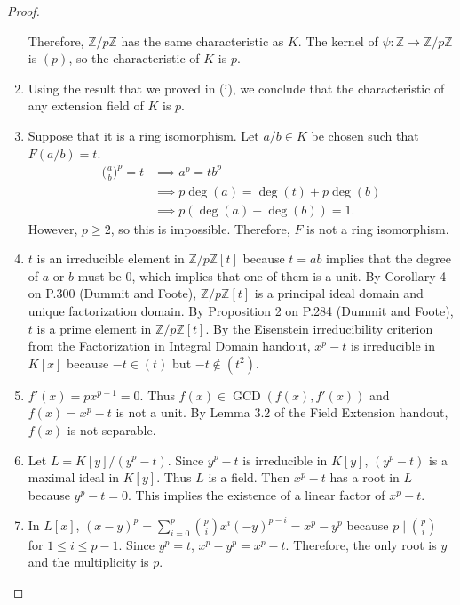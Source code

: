 \documentclass[12pt, psamsfonts]{amsart}
\theoremstyle{definition}
\theoremstyle{remark}
\DeclareMathOperator{\GCD}{GCD}
\numberwithin{equation}{section}
\begin{document}
\begin{proof}
\begin{enumerate}[label=(\roman*)]
      Therefore, $\mathbb{Z}/p\mathbb{Z}$ has the same characteristic as $K$.
      The kernel of $\psi: \mathbb{Z} \rightarrow \mathbb{Z}/p\mathbb{Z}$ is $(p)$, so the characteristic of $K$ is $p$.
    \item
      Using the result that we proved in (i), we conclude that the characteristic of any extension field of $K$ is $p$.
    \item
      Suppose that it is a ring isomorphism.
      Let $a / b \in K$ be chosen such that $F(a / b) = t$.
      \begin{align*}
        \big(\frac{a}{b}\big)^p = t
          &\implies a^p = tb^p \\
          &\implies p\deg(a) = \deg(t) + p\deg(b) \\
          &\implies p(\deg(a) - \deg(b)) = 1.
      \end{align*}
      However, $p \geq 2$, so this is impossible.
      Therefore, $F$ is not a ring isomorphism.
    \item
      $t$ is an irreducible element in $\mathbb{Z}/p\mathbb{Z}[t]$ because $t = ab$ implies that the degree of $a$ or $b$ must be 0, which implies that one of them is a unit.
      By Corollary 4 on P.300 (Dummit and Foote), $\mathbb{Z}/p\mathbb{Z}[t]$ is a principal ideal domain and unique factorization domain.
      By Proposition 2 on P.284 (Dummit and Foote), $t$ is a prime element in $\mathbb{Z}/p\mathbb{Z}[t]$.
      By the Eisenstein irreducibility criterion from the Factorization in Integral Domain handout, $x^p - t$ is irreducible in $K[x]$ because $-t \in (t)$ but $-t \notin (t^2)$.
    \item
      $f'(x) = px^{p - 1} = 0$.
      Thus $f(x) \in \GCD(f(x), f'(x))$ and $f(x) = x^p - t$ is not a unit.
      By Lemma 3.2 of the Field Extension handout, $f(x)$ is not separable.
    \item
      Let $L = K[y] / (y^p - t)$.
      Since $y^p - t$ is irreducible in $K[y]$, $(y^p - t)$ is a maximal ideal in $K[y]$.
      Thus $L$ is a field.
      Then $x^p - t$ has a root in $L$ because $y^p - t = 0$.
      This implies the existence of a linear factor of $x^p - t$.
    \item
      In $L[x]$, $(x - y)^p = \sum_{i=0}^{p} \binom{p}{i} x^i(-y)^{p - i} = x^p - y^p$ because $p \mid \binom{p}{i}$ for $1 \leq i \leq p - 1$.
      Since $y^p = t$, $x^p - y^p = x^p - t$.
      Therefore, the only root is $y$ and the multiplicity is $p$.
  \end{enumerate}
\end{proof}
\end{document}
